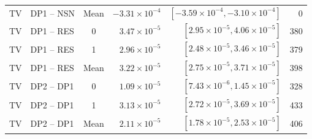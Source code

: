 \begin{tabular}{@{}llcrrr@{}}
TV & DP1 -- NSN & Mean & $-3.31\times10^{-4}$ & $[-3.59\times10^{-4}, -3.10\times10^{-4}]$ & 0 \\
TV & DP1 -- RES & 0 & $3.47\times10^{-5}$ & $[2.95\times10^{-5}, 4.06\times10^{-5}]$ & 380 \\
TV & DP1 -- RES & 1 & $2.96\times10^{-5}$ & $[2.48\times10^{-5}, 3.46\times10^{-5}]$ & 379 \\
TV & DP1 -- RES & Mean & $3.22\times10^{-5}$ & $[2.75\times10^{-5}, 3.71\times10^{-5}]$ & 398 \\
TV & DP2 -- DP1 & 0 & $1.09\times10^{-5}$ & $[7.43\times10^{-6}, 1.45\times10^{-5}]$ & 328 \\
TV & DP2 -- DP1 & 1 & $3.13\times10^{-5}$ & $[2.72\times10^{-5}, 3.69\times10^{-5}]$ & 433 \\
TV & DP2 -- DP1 & Mean & $2.11\times10^{-5}$ & $[1.78\times10^{-5}, 2.53\times10^{-5}]$ & 406 \\
\bottomrule
\end{tabular}\endgroup
